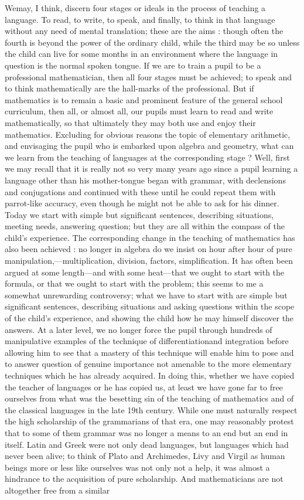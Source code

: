 We\pageoriginale may, I think, discern four stages or ideals in the process of teaching a language. To read, to write, to speak, and finally, to think in that language without any need of mental translation; these are the aims : though often the fourth is beyond the power of the ordinary child, while the third may be so unless the child can live for some months in an environment where the language in question is the normal spoken tongue. If we are to train a pupil to be a professional mathematician, then all four stages must be achieved; to speak and to think mathematically are the hall-marks of the professional. But if mathematics is to remain a basic and prominent feature of the general school curriculum, then all, or almost all, our pupils must learn to read and write mathematically, so that ultimately they may both use and enjoy their mathematics. Excluding for obvious reasons the topic of elementary arithmetic, and envisaging the pupil who is embarked upon algebra and geometry, what can we learn from the teaching of languages at the corresponding stage ? Well, first we may recall that it is really not so very many years ago since a pupil learning a language other than his mother-tongue began with grammar, with declensions and conjugations and continued with these until he could repeat them with parrot-like accuracy, even though he might not be able to ask for his dinner. Today we start with simple but significant sentences, describing situations, meeting needs, answering question; but they are all within the compass of the child's experience. The corresponding change in the teaching of mathematics has also been achieved : no longer in algebra do we insist on hour after hour of pure manipulation,---multiplication, division, factors, simplification. It has often been argued at some length---and with some heat---that we ought to start with the formula, or that we ought to start with the problem; this seems to me a somewhat unrewarding controversy; what we have to start with are simple but significant sentences, describing situations and asking questions within the scope of the child's experience, and showing the child how he may himself discover the answers. At a later level, we no longer force the pupil through hundreds of manipulative examples of the technique of differentiation\pageoriginale and integration before allowing him to see that a mastery of this technique will enable him to pose and to answer question of genuine importance not amenable to the more elementary techniques which he has already acquired. In doing this, whether we have copied the teacher of languages or he has copied us, at least we have gone far to free ourselves from what was the besetting sin of the teaching of mathematics and of the classical languages in the late 19th century. While one must naturally respect the high scholarship of the grammarians of that era, one may reasonably protest that to some of them grammar was no longer a means to an end but an end in itself. Latin and Greek were not only dead languages, but languages which had never been alive; to think of Plato and Archimedes, Livy and Virgil as human beings more or less like ourselves was not only not a help, it was almost a hindrance to the acquisition of pure scholarship. And mathematicians are not altogether free from a similar 